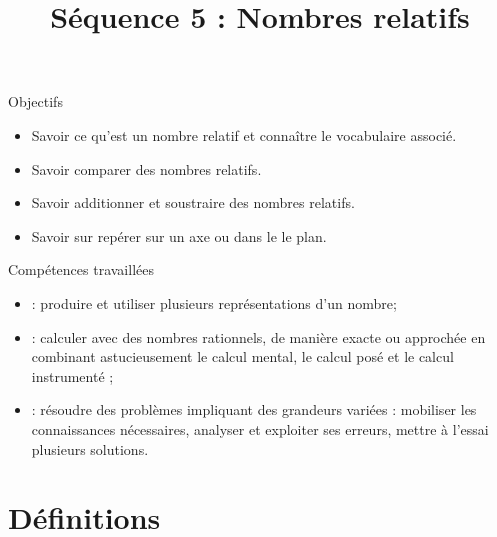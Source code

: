 \documentclass[xcolor={dvipsnames}]{beamer}
\title{Séquence 5 : Nombres relatifs}
\date{}
\begin{document}
\begin{frame}
  \titlepage 
\end{frame}


	

\begin{frame}
	\begin{block}{Objectifs}
		\begin{itemize}
			
		\item Savoir ce qu’est un nombre relatif et connaître le vocabulaire associé.
		\item Savoir comparer des nombres relatifs.
		\item Savoir additionner et soustraire des nombres relatifs.
		\item Savoir sur repérer sur un axe ou dans le le plan.
			
			\end{itemize}
	\end{block}
\end{frame}

\begin{frame}
	\begin{block}{Compétences travaillées}
		\begin{itemize}
			\item {} :  produire et utiliser plusieurs représentations d’un nombre;
			\item {} :  calculer avec des nombres rationnels, de manière exacte ou approchée en combinant astucieusement le calcul mental, le calcul posé et le calcul instrumenté ;
			\item {} :  résoudre des problèmes impliquant des grandeurs variées : mobiliser les connaissances nécessaires, analyser et exploiter ses erreurs, mettre à l’essai plusieurs solutions.		
		\end{itemize}
	\end{block}
\end{frame}



\section{Définitions}
\end{document}
